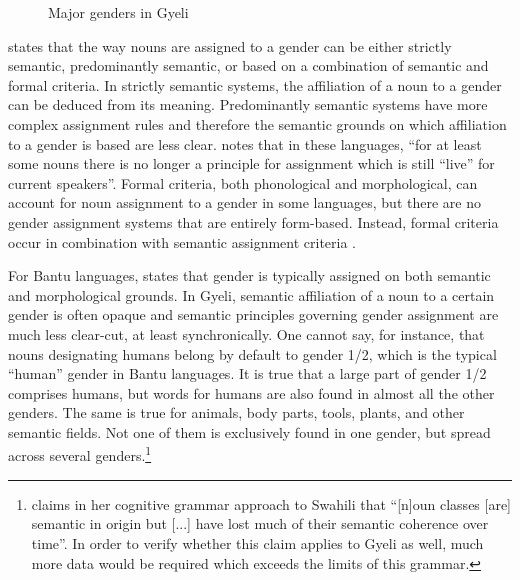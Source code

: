 \begin{figure}
\caption{Major genders in Gyeli}
\label{Fig:Gender}
\end{figure}


\citet{wals-32} states that the way nouns are assigned to a gender can be either strictly semantic, predominantly semantic, or based on a combination of semantic and formal criteria. In strictly semantic systems, the affiliation of a noun to a gender can be deduced from its meaning. Predominantly semantic systems have more complex assignment rules and therefore the semantic grounds on which affiliation to a gender is based are less clear. \citet[2]{wals-32} notes that in these languages, ``for at least some nouns there is no longer a principle for assignment which is still ``live'' for current speakers''.  
Formal criteria, both phonological and morphological, can account for noun assignment to a gender in some languages, but there are no gender assignment systems that are entirely form-based.  Instead, formal criteria occur in combination with semantic assignment criteria \citep[13]{wals-32}.


For Bantu languages, \citet[map 32]{wals-32} states  that gender is typically assigned on both semantic and morphological grounds.
In Gyeli, semantic affiliation of a noun to a certain gender is often opaque and semantic principles governing gender assignment are much less clear-cut, at least synchronically. One cannot say, for instance, that nouns designating humans belong by default to gender 1/2, which is the typical ``human'' gender in Bantu languages. It is true that a large part of gender 1/2 comprises humans, but words for humans are also found in almost all the other genders. The same is true for animals, body parts, tools, plants, and other semantic fields. Not one of them is exclusively found in one gender, but spread across several genders.\footnote{\citet[3]{contini2000}  claims in her cognitive grammar approach to Swahili that ``[n]oun classes [are] semantic in origin but [...] have lost much of their semantic coherence over time''.  In order to verify whether this claim applies to Gyeli as well, much more data would be required which exceeds the limits of this grammar.}

